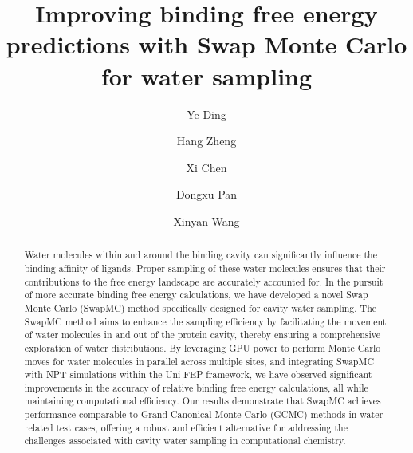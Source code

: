 \documentclass[journal=jacsat,manuscript=article]{achemso}
\author{Ye Ding}
\affiliation{ATOMBEAT Inc.}
\author{Hang Zheng}
\affiliation{ATOMBEAT Inc.}
\author{Xi Chen}
\affiliation{ATOMBEAT Inc.}
\author{Dongxu Pan}
\affiliation{ATOMBEAT Inc.}
\author{Xinyan Wang}
\affiliation{ATOMBEAT Inc.}
\title[An \textsf{achemso} demo]
  {Improving binding free energy predictions with Swap Monte Carlo for water sampling}
\begin{document}






\begin{abstract}
Water molecules within and around the binding cavity can significantly influence the binding affinity of ligands. 
Proper sampling of these water molecules ensures that their contributions to the free energy landscape are accurately accounted for. 
In the pursuit of more accurate binding free energy calculations, we have developed a novel Swap Monte Carlo (SwapMC) method specifically designed for cavity water sampling. 
The SwapMC method aims to enhance the sampling efficiency by facilitating the movement of water molecules in and out of the protein cavity, thereby ensuring a comprehensive exploration of water distributions. 
By leveraging GPU power to perform Monte Carlo moves for water molecules in parallel across multiple sites, and integrating SwapMC with NPT simulations within the Uni-FEP framework, 
we have observed significant improvements in the accuracy of relative binding free energy calculations, all while maintaining computational efficiency. 
Our results demonstrate that SwapMC achieves performance comparable to Grand Canonical Monte Carlo (GCMC) methods in water-related test cases, offering a robust and efficient alternative for addressing the challenges associated with cavity water sampling in computational chemistry. 
\end{abstract}
\end{document}
